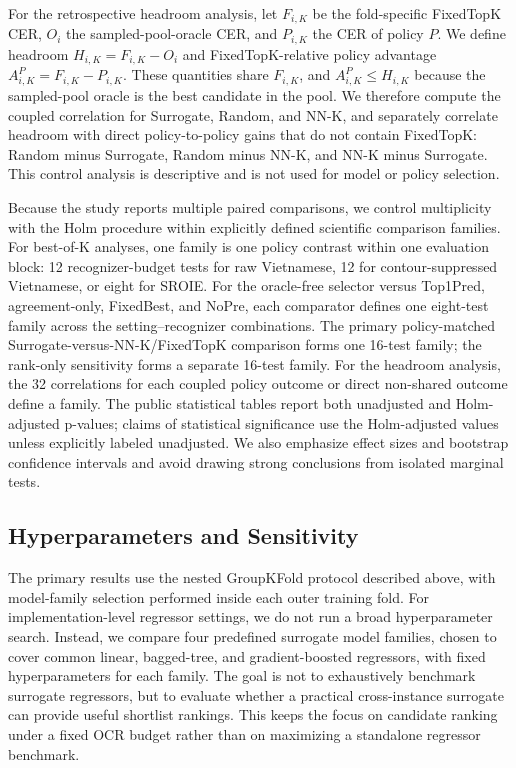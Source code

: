 \documentclass[pdflatex,sn-basic,Numbered,iicol]{sn-jnl}
\begin{document}
For the retrospective headroom analysis, let \(F_{i,K}\) be the fold-specific FixedTopK CER, \(O_i\) the sampled-pool-oracle CER, and \(P_{i,K}\) the CER of policy \(P\). We define headroom \(H_{i,K}=F_{i,K}-O_i\) and FixedTopK-relative policy advantage \(A_{i,K}^{P}=F_{i,K}-P_{i,K}\). These quantities share \(F_{i,K}\), and \(A_{i,K}^{P}\leq H_{i,K}\) because the sampled-pool oracle is the best candidate in the pool. We therefore compute the coupled correlation for Surrogate, Random, and NN-K, and separately correlate headroom with direct policy-to-policy gains that do not contain FixedTopK: Random minus Surrogate, Random minus NN-K, and NN-K minus Surrogate. This control analysis is descriptive and is not used for model or policy selection.

Because the study reports multiple paired comparisons, we control multiplicity with the Holm procedure within explicitly defined scientific comparison families. For best-of-K analyses, one family is one policy contrast within one evaluation block: 12 recognizer-budget tests for raw Vietnamese, 12 for contour-suppressed Vietnamese, or eight for SROIE. For the oracle-free selector versus Top1Pred, agreement-only, FixedBest, and NoPre, each comparator defines one eight-test family across the setting--recognizer combinations. The primary policy-matched Surrogate-versus-NN-K/FixedTopK comparison forms one 16-test family; the rank-only sensitivity forms a separate 16-test family. For the headroom analysis, the 32 correlations for each coupled policy outcome or direct non-shared outcome define a family. The public statistical tables report both unadjusted and Holm-adjusted p-values; claims of statistical significance use the Holm-adjusted values unless explicitly labeled unadjusted. We also emphasize effect sizes and bootstrap confidence intervals and avoid drawing strong conclusions from isolated marginal tests.

\subsection{Hyperparameters and Sensitivity}

The primary results use the nested GroupKFold protocol described above, with model-family selection performed inside each outer training fold. For implementation-level regressor settings, we do not run a broad hyperparameter search. Instead, we compare four predefined surrogate model families, chosen to cover common linear, bagged-tree, and gradient-boosted regressors, with fixed hyperparameters for each family. The goal is not to exhaustively benchmark surrogate regressors, but to evaluate whether a practical cross-instance surrogate can provide useful shortlist rankings. This keeps the focus on candidate ranking under a fixed OCR budget rather than on maximizing a standalone regressor benchmark.
\end{document}
